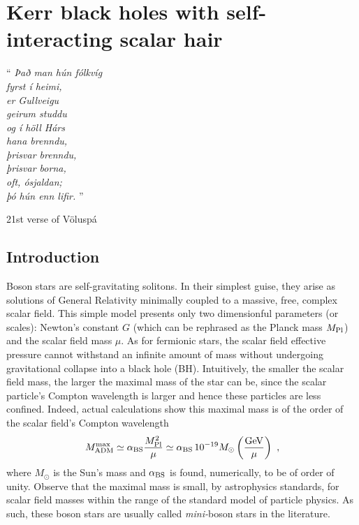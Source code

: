 \chapter{Kerr black holes with self-interacting scalar hair}
\label{ch:SI}

\epigraph{``\emph{
Það man hún fólkvíg \\
fyrst í heimi, \\
er Gullveigu \\
geirum studdu \\
og í höll Hárs \\
hana brenndu, \\
þrisvar brenndu, \\
þrisvar borna, \\
oft, ósjaldan; \\
þó hún enn lifir. 
} 
''}{21st verse of Völuspá}


\section{Introduction}
Boson stars are self-gravitating solitons.
In their simplest guise, they arise as solutions of General Relativity minimally coupled to a massive, free, complex scalar field\cite{Kaup:1968zz,Ruffini:1969qy}.
This simple model presents only two dimensionful parameters (or scales): Newton's constant $G$ (which can be rephrased as the Planck mass $M_{\rm Pl}$) and the scalar field mass $\mu$.
As for fermionic stars, the scalar field effective pressure cannot withstand an infinite amount of mass without undergoing gravitational collapse into a black hole (BH).
Intuitively, the smaller the scalar field mass, the larger the maximal mass of the star can be, since the scalar particle's Compton wavelength is larger and hence these particles are less confined. 
Indeed, actual calculations show this maximal mass is of the order of the scalar field's Compton wavelength
\begin{equation}
 M_{\rm ADM}^{\rm max}\simeq \alpha_{\rm BS} \frac{M_{\rm Pl}^2}{\mu}\simeq \alpha_{\rm BS} \, 10^{-19}M_\odot\left(\frac{\rm GeV}{\mu}\right)\ , 
\label{mini}
\end{equation}
where $M_{\odot}$ is the Sun's mass and $\alpha_{\rm BS}$ is found, numerically, to be of order of unity.
Observe that the maximal mass is small, by astrophysics standards, for scalar field masses within the range of the standard model of particle physics.
As such, these boson stars are usually called \textit{mini-}boson stars\cite{Schunck:2003kk} in the literature. 


